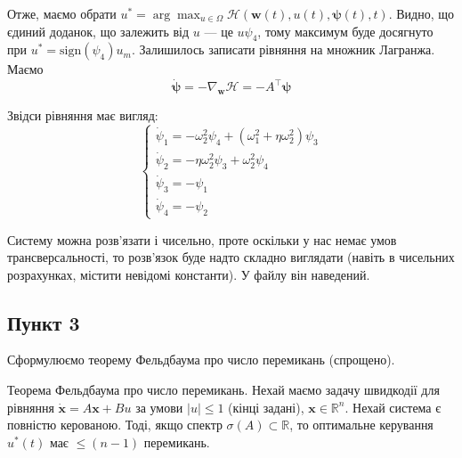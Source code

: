 \documentclass{hw_template}
\begin{document}
Отже, маємо обрати $u^* = \arg\max_{u \in \Omega}\mathcal{H}(\mathbf{w}(t), u(t), \boldsymbol{\psi}(t), t)$. Видно, що єдиний доданок, що залежить від $u$ --- це $u\psi_4$, тому максимум буде досягнуто при $u^* = \text{sign}(\psi_4)u_m$. Залишилось записати рівняння на множник Лагранжа. Маємо
\begin{equation*}
    \dot{\boldsymbol{\psi}} = -\nabla_{\boldsymbol{w}}\mathcal{H} = -A^{\top}\boldsymbol{\psi}
\end{equation*}

Звідси рівняння має вигляд:
\begin{equation*}
    \begin{cases}
        \dot{\psi}_1 = -\omega_2^2\psi_4 + (\omega_1^2 + \eta\omega_2^2)\psi_3 \\
        \dot{\psi}_2 = -\eta\omega_2^2\psi_3 + \omega_2^2\psi_4 \\
        \dot{\psi}_3 = -\psi_1 \\
        \dot{\psi}_4 = -\psi_2
    \end{cases}
\end{equation*}

Систему можна розв'язати і чисельно, проте оскільки у нас немає умов трансверсальності, то розв'язок буде надто складно виглядати (навіть в чисельних розрахунках, містити невідомі константи). У файлу він наведений.

\subsection{Пункт 3}

Сформулюємо теорему Фельдбаума про число перемикань (спрощено).

\begin{theorem}{Теорема Фельдбаума про число перемикань.}
    Нехай маємо задачу швидкодії для рівняння $\dot{\mathbf{x}} = A\mathbf{x} + Bu$ за умови $|u| \leq 1$ (кінці задані), $\mathbf{x} \in \mathbb{R}^n$. Нехай система є повністю керованою. Тоді, якщо спектр $\sigma(A) \subset \mathbb{R}$, то оптимальне керування $u^*(t)$ має $\leq (n-1)$ перемикань.
\end{theorem}
\end{document}
